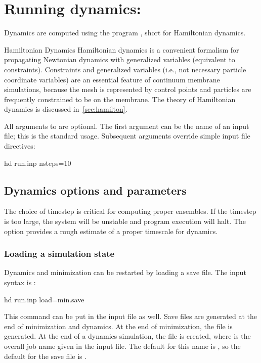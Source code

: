 
\section{ Running dynamics:  }

Dynamics are computed using the program , short for Hamiltonian dynamics. 

\begin{bcomment}{Hamiltonian Dynamics}
Hamiltonian dynamics is a convenient formalism for propagating Newtonian dynamics with generalized variables (equivalent to constraints). Constraints and generalized variables (i.e., not necessary particle coordinate variables) are an essential feature of continuum membrane simulations, because the mesh is represented by control points and particles are frequently constrained to be on the membrane. The theory of Hamiltonian dynamics is discussed in~\cref{sec:hamilton}. 
\end{bcomment}

All arguments to  are optional.
The first argument can be the name of an input file; this is the standard usage.
Subsequent arguments override simple input file directives:
\begin{command}
hd run.inp nsteps=10
\label{cmd:hd}
\end{command}


\subsection{Dynamics options and parameters }

The choice of timestep is critical for computing proper ensembles. 
If the timestep is too large, the system will be unstable and program execution will halt.
The option  provides a rough estimate of a proper timescale for dynamics.

\subsubsection{Loading a simulation state}

Dynamics and minimization can be restarted by loading a save file.
The input syntax is :
\begin{command}
hd run.inp load=min.save
\end{command}
This command can be put in the input file as well.
Save files are generated at the end of minimization and dynamics.
At the end of minimization, the file  is generated.
At the end of a dynamics simulation, the file  is created, where  is the overall job name given in the input file.
The default for this name is , so the default for the save file is .




